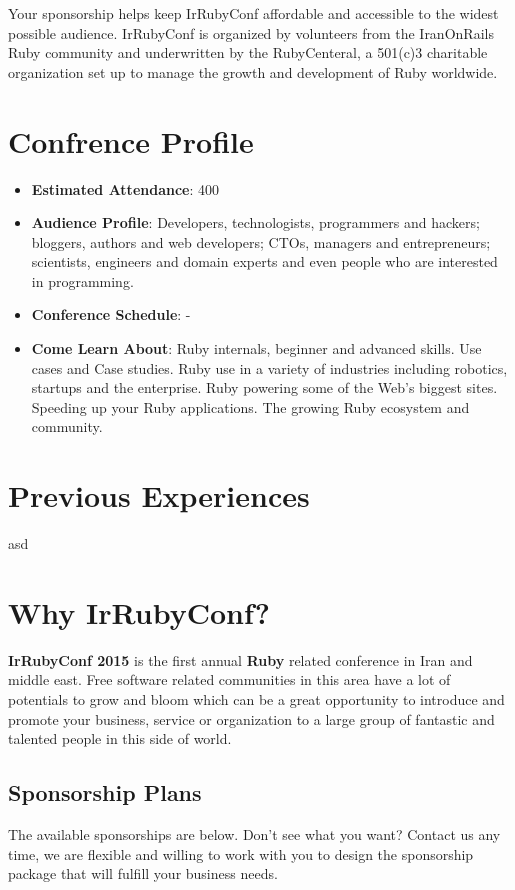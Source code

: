 \documentclass[a4paper,12pt]{article}
\begin{document}
Your sponsorship helps keep IrRubyConf affordable and accessible to the widest possible audience. IrRubyConf is organized by volunteers from the IranOnRails Ruby community and underwritten by the RubyCenteral, a 501(c)3 charitable organization set up to manage the growth and development of Ruby worldwide.
\section*{Confrence Profile}
\begin{itemize}
  \item{\textbf{Estimated Attendance}: 400}
  \item{\textbf{Audience Profile}: Developers, technologists, programmers and hackers; bloggers, authors and web developers; CTOs, managers and entrepreneurs; scientists, engineers and domain experts and even people who are interested in programming.
  }
  \item{\textbf{Conference Schedule}: -}
  \item{\textbf{Come Learn About}: Ruby internals, beginner and advanced skills. Use cases and Case studies. Ruby use in a variety of industries including robotics, startups and the enterprise. Ruby powering some of the Web’s biggest sites. Speeding up your Ruby applications. The growing Ruby ecosystem and community.
}
\end{itemize}
\section*{Previous Experiences}
asd
\section*{Why IrRubyConf?}
\textbf{IrRubyConf 2015} is the first annual \textbf{Ruby} related conference in Iran and middle east. Free software related communities in this area have a lot of potentials to grow and bloom which can be a great opportunity to introduce and promote your business, service or organization to a large group of fantastic and talented people in this side of world.
\subsection*{Sponsorship Plans}
The available sponsorships are below. Don't see what you want? Contact us any time, we are flexible and willing to work with you to design the sponsorship package that will fulfill your business needs.
\end{document}
